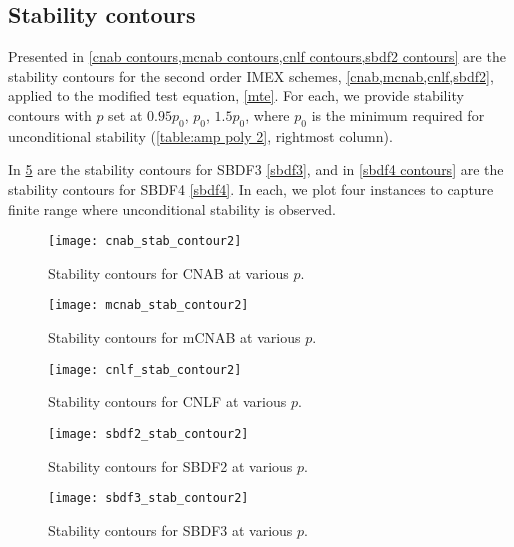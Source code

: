 \subsection{Stability contours}
Presented in \cref{cnab contours,mcnab contours,cnlf contours,sbdf2 contours} are the stability contours for the second order IMEX schemes, \cref{cnab,mcnab,cnlf,sbdf2}, applied to the modified test equation, \cref{mte}. For each, we provide stability contours with $p$ set at $0.95p_0$, $p_0$, $1.5p_0$, where $p_0$ is the minimum required for unconditional stability (\cref{table:amp poly 2}, rightmost column). 

In \cref{sbdf3 contours} are the stability contours for SBDF3 \cref{sbdf3}, and in \cref{sbdf4 contours} are the stability contours for SBDF4 \cref{sbdf4}. In each, we plot four instances to capture finite range where unconditional stability is observed.
\begin{figure}[htb!]
        \centering
\texttt{[image: cnab\_stab\_contour2]}
\caption{Stability contours for CNAB at various $p$.}
\label{cnab contours}
\end{figure}
\begin{figure}[htb!]
        \centering
\texttt{[image: mcnab\_stab\_contour2]}
\caption{Stability contours for mCNAB at various $p$.}
\label{mcnab contours}
\end{figure}
\begin{figure}[htb!]
        \centering
\texttt{[image: cnlf\_stab\_contour2]}
\caption{Stability contours for CNLF at various $p$.}
\label{cnlf contours}
\end{figure}
\begin{figure}[htb!]
        \centering
\texttt{[image: sbdf2\_stab\_contour2]}
\caption{Stability contours for SBDF2 at various $p$.}
\label{sbdf2 contours}
\end{figure}

\begin{figure}[htb!]
        \centering
\texttt{[image: sbdf3\_stab\_contour2]}
\caption{Stability contours for SBDF3 at various $p$.}
\label{sbdf3 contours}
\end{figure}

